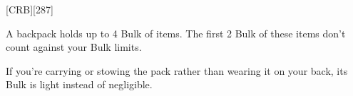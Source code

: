 
[CRB][287]

A backpack holds up to 4 Bulk of items. 
The first 2 Bulk of these items don't count against your Bulk limits. 

If you're carrying or stowing the pack rather than wearing it on your back, its Bulk is light instead of negligible.


\vfill

\ItemPrice{1sp}
\ItemBulk{-}
